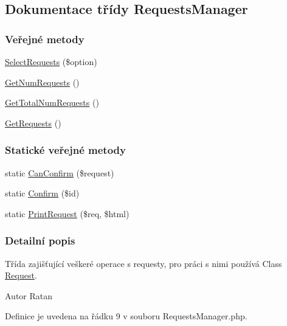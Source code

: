 \hypertarget{class_requests_manager}{\subsection{Dokumentace třídy Requests\-Manager}
\label{class_requests_manager}
}
\subsubsection*{Veřejné metody}
\begin{DoxyCompactItemize}
\item 
\hyperlink{class_requests_manager_acfdecc085243987f67da504dd2e1af72}{Select\-Requests} (\$option)
\item 
\hyperlink{class_requests_manager_afd9c788f87995f0d91f6692cd113a71c}{Get\-Num\-Requests} ()
\item 
\hyperlink{class_requests_manager_a66c5577073654f827865644143815ec6}{Get\-Total\-Num\-Requests} ()
\item 
\hyperlink{class_requests_manager_aeb4db3d7b6c9ce1e1b63fa883a24bfaa}{Get\-Requests} ()
\end{DoxyCompactItemize}
\subsubsection*{Statické veřejné metody}
\begin{DoxyCompactItemize}
\item 
static \hyperlink{class_requests_manager_a4d04659c668642a970e78b8d0e1973f5}{Can\-Confirm} (\$request)
\item 
static \hyperlink{class_requests_manager_a6a09fbbab467ed15524694dfdff662a5}{Confirm} (\$id)
\item 
static \hyperlink{class_requests_manager_ab68ed511053eb15ecf2850ff2145348b}{Print\-Request} (\$req, \$html)
\end{DoxyCompactItemize}


\subsubsection{Detailní popis}
Třída zajišťující veškeré operace s requesty, pro práci s nimi používá Class \hyperlink{class_request}{Request}. \begin{DoxyAuthor}{Autor}
Ratan 
\end{DoxyAuthor}


Definice je uvedena na řádku 9 v souboru Requests\-Manager.\-php.



